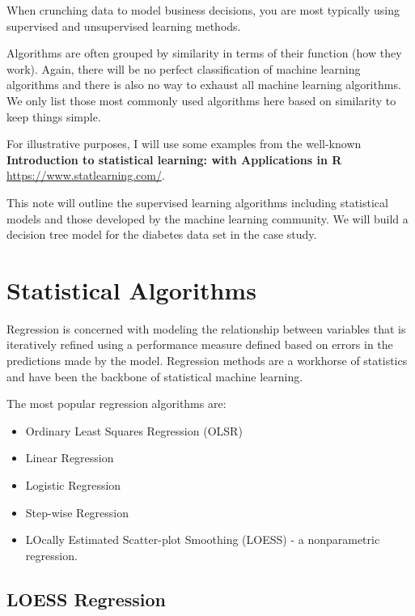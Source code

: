 \documentclass[
]{book}
\providecommand{\tightlist}{%
  \setlength{\itemsep}{0pt}\setlength{\parskip}{0pt}}
\begin{document}
When crunching data to model business decisions, you are most typically using supervised and unsupervised learning methods.

Algorithms are often grouped by similarity in terms of their function (how they work). Again, there will be no perfect classification of machine learning algorithms and there is also no way to exhaust all machine learning algorithms. We only list those most commonly used algorithms here based on similarity to keep things simple.

For illustrative purposes, I will use some examples from the well-known \textbf{Introduction to statistical learning: with Applications in R} \url{https://www.statlearning.com/}.

This note will outline the supervised learning algorithms including statistical models and those developed by the machine learning community. We will build a decision tree model for the diabetes data set in the case study.

\hypertarget{statistical-algorithms}{%
\section{Statistical Algorithms}\label{statistical-algorithms}}

Regression is concerned with modeling the relationship between variables that is iteratively refined using a performance measure defined based on errors in the predictions made by the model. Regression methods are a workhorse of statistics and have been the backbone of statistical machine learning.

The most popular regression algorithms are:

\begin{itemize}
\tightlist
\item
  Ordinary Least Squares Regression (OLSR)
\item
  Linear Regression
\item
  Logistic Regression
\item
  Step-wise Regression
\item
  LOcally Estimated Scatter-plot Smoothing (LOESS) - a nonparametric regression.
\end{itemize}

\hfill\break

\hypertarget{loess-regression}{%
\subsection{LOESS Regression}\label{loess-regression}}
\end{document}
